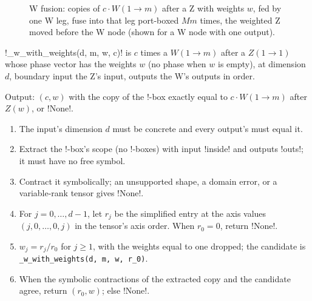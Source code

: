 \begin{figure}[H]
\centering
{}
\caption{W fusion: copies of $c\cdot W(1\to m)$ after a Z with weights $w$, fed by one W leg, fuse into that leg port-boxed $Mm$ times, the weighted Z moved before the W node (shown for a W node with one output).}\label{fig:kernel-wfusion}
\end{figure}

\py!_w_with_weights(d, m, w, c)! is $c$ times a $W(1\to m)$ after a $Z(1\to1)$ whose phase vector has the weights $w$ (no phase when $w$ is empty), at dimension $d$, boundary input the Z's input, outputs the W's outputs in order.

\begin{algorithm}\label{alg:kernel-w-body}
Output: $(c, w)$ with the copy of the !-box exactly equal to $c\cdot W(1\to m)$ after $Z(w)$, or \py!None!.
\begin{enumerate}
\item The input's dimension $d$ must be concrete and every output's must equal it.
\item Extract the !-box's scope (no !-boxes) with input \code!inside! and outputs \code!outs!; it must have no free symbol.
\item Contract it symbolically; an unsupported shape, a domain error, or a variable-rank tensor gives \py!None!.
\item For $j=0,\ldots,d-1$, let $r_j$ be the simplified entry at the axis values $(j,0,\ldots,0,j)$ in the tensor's axis order. When $r_0=0$, return \py!None!.
\item $w_j=r_j/r_0$ for $j\ge1$, with the weights equal to one dropped; the candidate is \texttt{\_\allowbreak{}w\_\allowbreak{}with\_\allowbreak{}weights(\allowbreak{}d,\allowbreak{} m,\allowbreak{} w,\allowbreak{} r\_\allowbreak{}0)}.
\item When the symbolic contractions of the extracted copy and the candidate agree, return $(r_0, w)$; else \py!None!.
\end{enumerate}
\end{algorithm}

